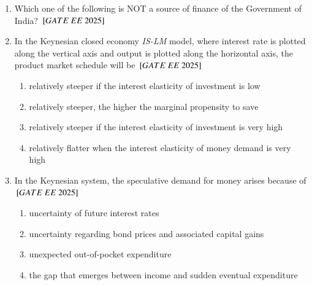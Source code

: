 \documentclass[journal,12pt,onecolumn]{IEEEtran}
\theoremstyle{remark}
\begin{document}
\begin{enumerate}
\item Which one of the following is NOT a source of finance of the Government of India?
\hfill $\sbrak{GATE\ EE\ 2025}$
    \begin{enumerate}
       \end{enumerate}
 
\item In the Keynesian closed economy \textit{IS-LM} model, where interest rate is plotted along the vertical axis and output is plotted along the horizontal axis, the product market schedule will be
\hfill $\sbrak{GATE\ EE\ 2025}$
    \begin{enumerate}
    \item relatively steeper if the interest elasticity of investment is low
    \item relatively steeper, the higher the marginal propensity to save
    \item relatively steeper if the interest elasticity of investment is very high
    \item relatively flatter when the interest elasticity of money demand is very high
    \end{enumerate}
 
\item In the Keynesian system, the speculative demand for money arises because of
\hfill $\sbrak{GATE\ EE\ 2025}$
    \begin{enumerate}
    \item uncertainty of future interest rates
    \item uncertainty regarding bond prices and associated capital gains
    \item unexpected out-of-pocket expenditure
    \item the gap that emerges between income and sudden eventual expenditure
   \end{enumerate}
 

\end{enumerate}
\end{document}
